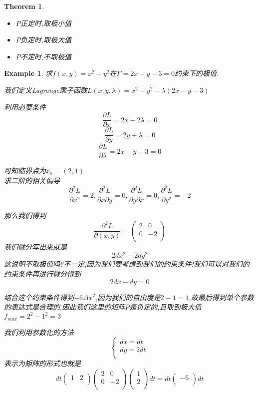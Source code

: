 \documentclass[11pt,hyperref,a4paper,UTF8]{ctexart}
\newtheorem{theorem}{Theorem}[subsection]
\newtheorem{example}{Example}[subsection]
\begin{document}
\begin{CJK}{UTF8}{gkai}
\begin{theorem}
\begin{itemize}
  \item $P$正定时,取极小值
  \item $P$负定时,取极大值
  \item $P$不定时,不取极值
\end{itemize}

\end{theorem}

\begin{example}
  求$f(x,y) = x^2 - y^2$在$F = 2x - y - 3 = 0$约束下的极值.

  我们定义Lagrange乘子函数$L(x,y,\lambda) = x^2 - y^2 - \lambda(2x - y - 3)$

  利用必要条件
  \[\frac{\partial L}{\partial x} = 2x - 2\lambda = 0\]
  \[\frac{\partial L}{\partial y} = 2y + \lambda = 0\]
  \[\frac{\partial L}{\partial \lambda} = 2x - y - 3 = 0\]

  可知临界点为$x_0 = (2,1)$\\

  求二阶的相关偏导
  \[\frac{\partial^2 L}{\partial x^2} = 2,\frac{\partial^2 L}{\partial x \partial y} = 0,\frac{\partial^2 L}{\partial y\partial x} = 0,\frac{\partial^2 L}{\partial y^2} = -2\]

  那么我们得到
  \[\frac{\partial^2 L}{\partial(x,y)} = \begin{pmatrix}
    2&0\\
    0&-2\\
  \end{pmatrix}\]
  我们微分写出来就是
  \[2 dx^2 - 2 dy^2\]
  这说明不取极值吗?不一定,因为我们要考虑到我们的约束条件!我们可以对我们的约束条件再进行微分得到
  \[2 dx - dy = 0\]

  结合这个约束条件得到$- 6 \Delta x^2$,因为我们的自由度是$2 - 1 = 1$,故最后得到单个参数的表达式是合理的,因此我们这里的矩阵$P$是负定的,且取到极大值$f_{max} = 2^2 - 1^2 = 3$

  我们利用参数化的方法
  \[\begin{cases}
    dx = dt\\
    dy = 2 dt\\
  \end{cases}\]
  表示为矩阵的形式也就是
  \[dt\begin{pmatrix}
    1&2\\
  \end{pmatrix}
  \begin{pmatrix}
    2&0\\
    0&-2\\
  \end{pmatrix}
  \begin{pmatrix}
    1\\
    2\\
  \end{pmatrix}
  dt
  =
  dt \begin{pmatrix}
    -6\\
  \end{pmatrix}
  dt\]
\end{example}


\end{CJK}
\end{document}

